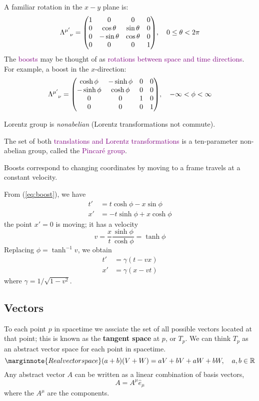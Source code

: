 A familiar rotation in the $x-y$ plane is:
\begin{equation*}
    \tensor{\Lambda}{^{\mu'}_\nu}=\mqty(1&0&0&0\\0&\cos\theta&\sin\theta&0\\0&-\sin\theta&\cos\theta&0\\0&0&0&1),\quad 0\leq\theta <2\pi
\end{equation*}
The \textcolor{purple}{boosts} may be thought of as \textcolor{purple}{rotations between space and time directions}. For example, a boost in the $x$-direction:
\begin{equation}\label{eq:boost}
    \tensor{\Lambda}{^{\mu'}_\nu}=\mqty(\cosh\phi&-\sinh\phi&0&0\\-\sinh\phi&\cosh\phi&0&0\\0&0&1&0\\0&0&0&1),\quad -\infty<\phi<\infty
\end{equation}

Lorentz group is \textit{nonabelian} (Lorentz transformations not commute).

The set of both \textcolor{purple}{translations and Lorentz transformations} is a ten-parameter non-abelian group, called the \textcolor{purple}{Pincaré group}.

Boosts correspond to changing coordinates by moving to a frame travels at a constant velocity.

From (\ref{eq:boost}), we have
\begin{align*}
    t'&=t\cosh\phi-x\sin\phi\\
    x'&=-t\sinh\phi+x\cosh\phi
\end{align*}
the point $x'=0$ is moving; it has a velocity
\begin{equation*}
    v=\frac{x}{t}\frac{\sinh\phi}{\cosh\phi}=\tanh\phi
\end{equation*}
Replacing $\phi=\tanh^{-1}v$, we obtain
\begin{align*}
    t'&=\gamma(t-vx)\\
    x'&=\gamma(x-vt)
\end{align*}
where $\gamma=1/\sqrt{1-v^2}$.

\subsection{Vectors}
To each point $p$ in spacetime we assciate the set of all possible vectors located at that point; this is known as the \textbf{tangent space} at $p$, or $T_p$. We can think $T_p$ as an abstract vector space for each point in spacetime.
\begin{equation*}\marginnote{Real vector space}
    (a+b)(V+W)=aV+bV+aW+bW,\quad a,b\in\mathbb{R}
\end{equation*}
Any abstract vector $A$ can be written as a linear combination of basis vectors,
\begin{equation*}
    A=A^\mu\hat{e}_\mu
\end{equation*}
where the $A^\mu$ are the components.

